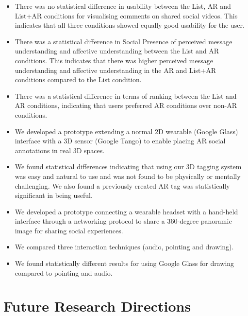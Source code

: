 \begin{itemize}
    \item{There was no statistical difference in usability between the List, AR and List+AR conditions for visualising comments on shared social videos. This indicates that all three conditions showed equally good usability for the user.}
    \item{There was a statistical difference in Social Presence of perceived message understanding and affective understanding between the List and AR conditions. This indicates that there was higher perceived message understanding and affective understanding in the AR and List+AR conditions compared to the List condition.}
    \item{There was a statistical difference in terms of ranking between the List and AR conditions, indicating that users preferred AR conditions over non-AR conditions.}
    \item{We developed a prototype extending a normal 2D wearable (Google Glass) interface with a 3D sensor (Google Tango) to enable placing AR social annotations in real 3D spaces.}
    \item{We found statistical differences indicating that using our 3D tagging system was easy and natural to use and was not found to be physically or mentally challenging. We also found a previously created AR tag was statistically significant in being useful.}
    \item{We developed a prototype connecting a wearable headset with a hand-held interface through a networking protocol to share a 360-degree panoramic image for sharing social experiences.}
    \item{We compared three interaction techniques (audio, pointing and drawing).}
    \item{We found statistically different results for using Google Glass for drawing compared to pointing and audio.}
\end{itemize}



\section{Future Research Directions}

